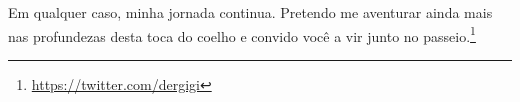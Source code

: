 Em qualquer caso, minha jornada continua. Pretendo me aventurar ainda mais nas profundezas desta toca do coelho e convido você a vir junto no passeio.\footnote{\url{https://twitter.com/dergigi}}

%
